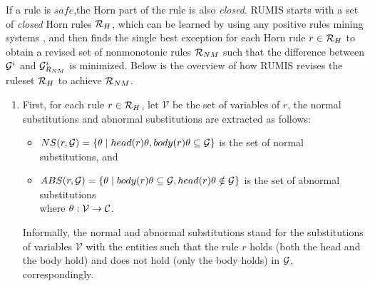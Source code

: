  If a rule is $safe$,the Horn part of the rule is also \textit{closed}. RUMIS starts with a set of \textit{closed} Horn rules $\mathcal{R}_H$, which can be learned by using any positive rules mining systems \cite{amie,op,rdf2rules}, and then finds the single best exception for each Horn rule $r \in \mathcal{R}_H$ to obtain a revised set of nonmonotonic rules $\mathcal{R}_{NM}$ such that the difference between $\mathcal{G}^i$ and $\mathcal{G}^i_{R_{NM}}$ is minimized. Below is the overview of how RUMIS revises the ruleset $\mathcal{R}_H$ to achieve $\mathcal{R}_{NM}$.
\begin{enumerate}
\item First, for each rule $r \in \mathcal{R}_H$, let $\mathcal{V}$ be the set of variables of $r$, the normal substitutions and abnormal substitutions are extracted as follows:
\begin{itemize}
\item $NS(r, \mathcal{G}) = \{\theta \mid head(r)\theta, body(r)\theta \subseteq \mathcal{G}\}$ is the set of normal substitutions, and
\item $ABS(r, \mathcal{G}) = \{\theta \mid body(r)\theta \subseteq \mathcal{G} , head(r)\theta \notin \mathcal{G}\}$ is the set of abnormal substitutions\\
where $\theta: \mathcal{V} \rightarrow \mathcal{C}$.
\end{itemize}
Informally, the normal and abnormal substitutions stand for the substitutions of variables $\mathcal{V}$ with the entities such that the rule $r$ holds (both the head and the body hold) and does not hold (only the body holds) in $\mathcal{G}$, correspondingly.


\end{enumerate}
